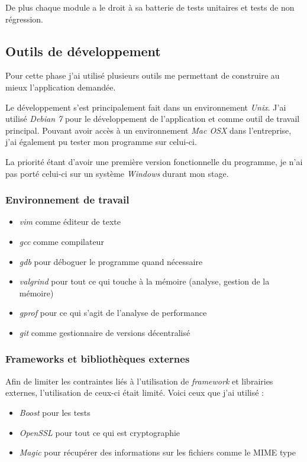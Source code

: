 \documentclass[a4paper,10pt, twoside]{report}
\begin{document}
\begin{spacing}{1.2}
De plus chaque module a le droit à sa batterie de tests unitaires et tests de
non régression.

\subsection{Outils de développement}
Pour cette phase j'ai utilisé plusieurs outils me permettant de construire
au mieux l'application demandée. 

Le développement s'est principalement fait dans un environnement
\textit{Unix}. J'ai utilisé \textit{Debian 7} pour le développement de
l'application et comme outil de travail principal. Pouvant avoir accès à un
environnement \textit{Mac OSX} dans l'entreprise, j'ai également pu tester
mon programme sur celui-ci.

La priorité étant d'avoir une première version fonctionnelle du
programme, je n'ai pas porté celui-ci sur un système \textit{Windows}
durant mon stage.

\subsubsection{Environnement de travail}
\begin{itemize}
 \item \textit{vim} comme éditeur de texte
 \item \textit{gcc} comme compilateur
 \item \textit{gdb} pour déboguer le programme quand nécessaire
 \item \textit{valgrind} pour tout ce qui touche à la mémoire (analyse,
 gestion de la mémoire)
 \item \textit{gprof} pour ce qui s'agit de l'analyse de performance
 \item \textit{git} comme gestionnaire de versions décentralisé
\end{itemize}

\subsubsection{Frameworks et bibliothèques externes}
Afin de limiter les contraintes liés à l'utilisation de \textit{framework}
et librairies externes, l'utilisation de ceux-ci était limité. Voici
ceux que j'ai utilisé :
\begin{itemize}
 \item \textit{Boost} pour les tests
 \item \textit{OpenSSL} pour tout ce qui est cryptographie
 \item \textit{Magic} pour récupérer des informations sur les fichiers
 comme le MIME type
\end{itemize}


\end{spacing}
\end{document}
